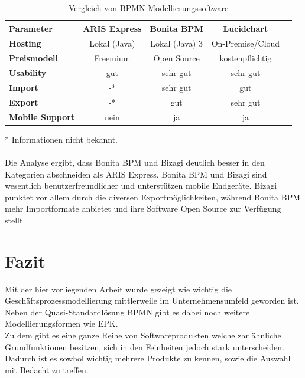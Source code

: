 \begin{table}[h]
\begin{tabularx}{\textwidth}{|X|c|c|c|c|}
	\hline
	\textbf{Parameter}  & \textbf{ARIS Express} &
	\textbf{Bonita BPM} & \textbf{Lucidchart}  \\
	\hline
	\hline
	\textbf{Hosting} & {Lokal (Java)} & {Lokal (Java)} 3 & {On-Premise/Cloud}
	\\
	\hline
	\textbf{Preismodell} & Freemium & Open Source &  kostenpflichtig\\
	\hline
	\textbf{Usability} & gut & sehr gut & sehr gut \\
	\hline
	\textbf{Import} & -* & sehr gut & gut \\
	\hline
	\textbf{Export} & -* & gut & sehr gut \\
	\hline
	\textbf{Mobile Support} & nein & ja & ja \\
	\hline
\end{tabularx}
\caption{Vergleich von BPMN-Modellierungssoftware}
\end{table}
* Informationen nicht bekannt.
\\
\\
Die Analyse ergibt, dass Bonita BPM und Bizagi deutlich
besser in den Kategorien abschneiden als ARIS Express. Bonita BPM und Bizagi
sind wesentlich benutzerfreundlicher und unterstützen mobile
Endgeräte. Bizagi punktet vor allem durch die diversen Exportmöglichkeiten, während Bonita BPM mehr Importformate anbietet und ihre
Software Open Source zur Verfügung stellt.

\clearpage
\section{Fazit}

Mit der hier vorliegenden Arbeit wurde gezeigt wie wichtig die
Geschäftsprozessmodellierung mittlerweile im Unternehmensumfeld geworden ist.
Neben der Quasi-Standardlösung BPMN gibt es dabei noch weitere
Modellierungsformen wie EPK.\\
Zu dem gibt es eine ganze Reihe von Softwareprodukten welche zar ähnliche
Grundfunktionen besitzen, sich in den Feinheiten jedoch stark unterscheiden.
Dadurch ist es sowhol wichtig mehrere Produkte zu kennen, sowie die Auswahl
 mit Bedacht zu treffen.


\clearpage
